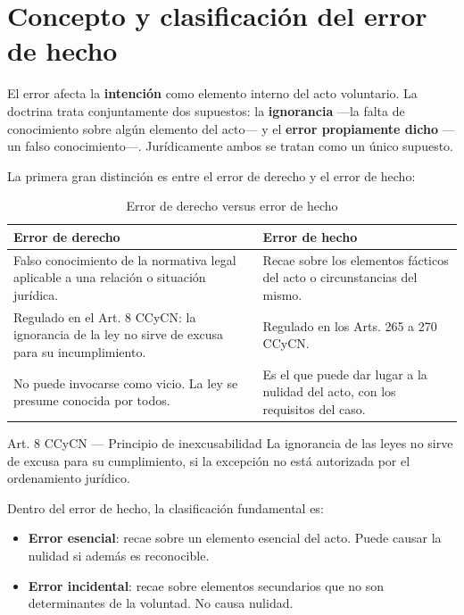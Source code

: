 \documentclass[12pt,oneside]{book}
\begin{document}
\section{Concepto y clasificación del error de hecho}

El error afecta la \textbf{intención} como elemento interno del acto voluntario. La doctrina trata conjuntamente dos supuestos: la \textbf{ignorancia} ---la falta de conocimiento sobre algún elemento del acto--- y el \textbf{error propiamente dicho} ---un falso conocimiento---. Jurídicamente ambos se tratan como un único supuesto.

La primera gran distinción es entre el error de derecho y el error de hecho:

\begin{table}[H]
\centering
\begin{tabularx}{\textwidth}{>{\raggedright\arraybackslash}X >{\raggedright\arraybackslash}X}
\toprule
\textbf{Error de derecho} & \textbf{Error de hecho} \\
\midrule
Falso conocimiento de la normativa legal aplicable a una relación o situación jurídica. & Recae sobre los elementos fácticos del acto o circunstancias del mismo. \\[6pt]
Regulado en el Art. 8 CCyCN: la ignorancia de la ley no sirve de excusa para su incumplimiento. & Regulado en los Arts. 265 a 270 CCyCN. \\[6pt]
No puede invocarse como vicio. La ley se presume conocida por todos. & Es el que puede dar lugar a la nulidad del acto, con los requisitos del caso. \\
\bottomrule
\end{tabularx}
\caption{Error de derecho versus error de hecho}
\end{table}

\begin{articulo}{Art. 8 CCyCN --- Principio de inexcusabilidad}
La ignorancia de las leyes no sirve de excusa para su cumplimiento, si la excepción no está autorizada por el ordenamiento jurídico.
\end{articulo}

Dentro del error de hecho, la clasificación fundamental es:

\begin{itemize}
    \item \textbf{Error esencial}: recae sobre un elemento esencial del acto. Puede causar la nulidad si además es reconocible.
    \item \textbf{Error incidental}: recae sobre elementos secundarios que no son determinantes de la voluntad. No causa nulidad.
\end{itemize}
\end{document}
